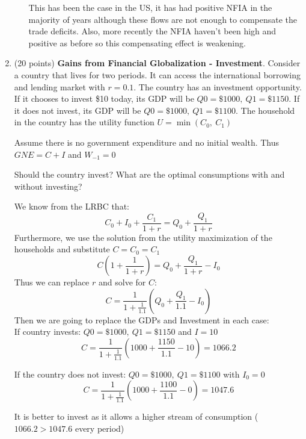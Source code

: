 \documentclass[11pt,dvipsnames]{article} %
\newif \ifAnswers
\begin{document}
\begin{enumerate}
\begin{enumerate}
{\begin{framed}
					This has been the case in the US, it has had positive NFIA in the majority of years although these flows are not enough to compensate the trade deficits. Also, more recently the NFIA haven't been high and positive as before so this compensating effect is weakening.
				\end{framed}
			}
			
			\fi
			
		
		\end{enumerate}
	
	\item (20 points)\textbf{ Gains from Financial Globalization - Investment}. Consider a country that lives for two periods. It can access the international borrowing and lending market with $r = 0.1$. The country has an investment opportunity. If it chooses to invest
	\$10 today, its GDP will be $Q0 = \$1000, \ Q1 = \$1150$. If it does not invest, its GDP will be $Q0 = \$1000, \ Q1 = \$1100$. The household in the country has the utility function $U = \min(C_0, \ C_1)$
	
	Assume there is no government expenditure and no initial wealth. Thus $GNE = C + I$ and $W_{-1} = 0$
	
	Should the country invest? What are the optimal consumptions with and without investing?	
	
	\ifAnswers
	
	{\color{Blue}
		\begin{framed}
			We know from the LRBC that: 
			\[ C_0 + I_0 + \frac{C_1}{1 + r} = Q_0 + \frac{Q_1}{1 + r} \]
			Furthermore, we use the solution from the utility maximization of the households and substitute $C = C_0 = C_1$
			\[ C (1 + \frac{1}{1+r})  = Q_0 + \frac{Q_1}{1 + r} -  I_0  \]
			Thus we can replace $r$ and solve for $C$:
			\[ C = \frac{1}{1+\frac{1}{1.1}}\left(Q_0 + \frac{Q_1}{1.1} -  I_0\right)\]
			Then we are going to replace the GDPs and Investment in each case: \\
			
			If country invests: $Q0 = \$1000, \ Q1 = \$1150$ and $I = 10$
			\[ C = \frac{1}{1+\frac{1}{1.1}}\left(1000 + \frac{1150}{1.1} -  10\right) = 1066.2\]
			
			If the country does not invest:  $Q0 = \$1000, \ Q1 = \$1100$ with $I_0=0$
			\[ C = \frac{1}{1+\frac{1}{1.1}}\left(1000 + \frac{1100}{1.1} -  0\right) = 1047.6\]
			
			It is better to invest as it allows a higher stream of consumption ($1066.2>1047.6$ every period)
		\end{framed}%
	}
	

\end{enumerate}
\end{document}
